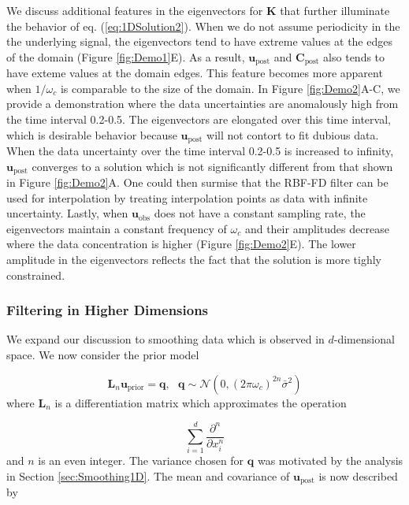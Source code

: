 \documentclass[10pt,a4paper]{article}
\begin{document}
We discuss additional features in the eigenvectors for $\mathbf{K}$ that further illuminate the behavior of eq. (\ref{eq:1DSolution2}).  When we do not assume periodicity in the the underlying signal, the eigenvectors tend to have extreme values at the edges of the domain (Figure \ref{fig:Demo1}E). As a result, $\mathbf{u}_\mathrm{post}$ and $\mathbf{C}_\mathrm{post}$ also tends to have exteme values at the domain edges.  This feature becomes more apparent when $1/\omega_c$ is comparable to the size of the domain.  In Figure \ref{fig:Demo2}A-C, we provide a demonstration where the data uncertainties are anomalously high from the time interval 0.2-0.5.  The eigenvectors are elongated over this time interval, which is desirable behavior because $\mathbf{u}_\mathrm{post}$ will not contort to fit dubious data.  When the data uncertainty over the time interval 0.2-0.5 is increased to infinity, $\mathbf{u}_\mathrm{post}$ converges to a solution which is not significantly different from that shown in Figure \ref{fig:Demo2}A.  One could then surmise that the RBF-FD filter can be used for interpolation by treating interpolation points as data with infinite uncertainty.  Lastly, when $\mathbf{u}_\mathrm{obs}$ does not have a constant sampling rate, the eigenvectors maintain a constant frequency of $\omega_c$ and their amplitudes decrease where the data concentration is higher (Figure \ref{fig:Demo2}E).  The lower amplitude in the eigenvectors reflects the fact that the solution is more tighly constrained.    

\subsubsection{Filtering in Higher Dimensions}\label{sec:SmoothingND} 
We expand our discussion to smoothing data which is observed in $d$-dimensional space. We now consider the prior model

\begin{equation}
  \mathbf{L}_n \mathbf{u}_\mathrm{prior} = \mathbf{q}, \ \ \ \mathbf{q} \sim \mathcal{N}(0,(2\pi\omega_c)^{2n}\bar{\sigma}^2)
\end{equation}  
where $\mathbf{L}_n$ is a differentiation matrix which approximates the operation 

\begin{equation}\label{eq:NDOperator}
  \sum_{i=1}^d\frac{\partial^n}{\partial x_i^n} 
\end{equation} 
and $n$ is an even integer. The variance chosen for $\mathbf{q}$ was motivated by the analysis in Section \ref{sec:Smoothing1D}. The mean and covariance of $\mathbf{u}_\mathrm{post}$ is now described by
\end{document}
